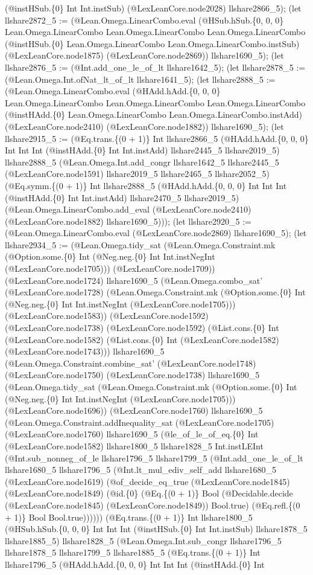 \documentclass[11pt]{article}
\begin{document}
(@instHSub.\{0\} Int Int.instSub) (@LexLeanCore.node2028) llshare2866\_5); (let llshare2872\_5 := (@Lean.Omega.LinearCombo.eval (@HSub.hSub.\{0, 0, 0\} Lean.Omega.LinearCombo Lean.Omega.LinearCombo Lean.Omega.LinearCombo (@instHSub.\{0\} Lean.Omega.LinearCombo Lean.Omega.LinearCombo.instSub) (@LexLeanCore.node1875) (@LexLeanCore.node2869)) llshare1690\_5); (let llshare2876\_5 := (@Int.add\_one\_le\_of\_lt llshare1642\_5); (let llshare2878\_5 := (@Lean.Omega.Int.ofNat\_lt\_of\_lt llshare1641\_5); (let llshare2888\_5 := (@Lean.Omega.LinearCombo.eval (@HAdd.hAdd.\{0, 0, 0\} Lean.Omega.LinearCombo Lean.Omega.LinearCombo Lean.Omega.LinearCombo (@instHAdd.\{0\} Lean.Omega.LinearCombo Lean.Omega.LinearCombo.instAdd) (@LexLeanCore.node2410) (@LexLeanCore.node1882)) llshare1690\_5); (let llshare2915\_5 := (@Eq.trans.\{(0 + 1)\} Int llshare2866\_5 (@HAdd.hAdd.\{0, 0, 0\} Int Int Int (@instHAdd.\{0\} Int Int.instAdd) llshare2445\_5 llshare2019\_5) llshare2888\_5 (@Lean.Omega.Int.add\_congr llshare1642\_5 llshare2445\_5 (@LexLeanCore.node1591) llshare2019\_5 llshare2465\_5 llshare2052\_5) (@Eq.symm.\{(0 + 1)\} Int llshare2888\_5 (@HAdd.hAdd.\{0, 0, 0\} Int Int Int (@instHAdd.\{0\} Int Int.instAdd) llshare2470\_5 llshare2019\_5) (@Lean.Omega.LinearCombo.add\_eval (@LexLeanCore.node2410) (@LexLeanCore.node1882) llshare1690\_5))); (let llshare2920\_5 := (@Lean.Omega.LinearCombo.eval (@LexLeanCore.node2869) llshare1690\_5); (let llshare2934\_5 := (@Lean.Omega.tidy\_sat (@Lean.Omega.Constraint.mk (@Option.some.\{0\} Int (@Neg.neg.\{0\} Int Int.instNegInt (@LexLeanCore.node1705))) (@LexLeanCore.node1709)) (@LexLeanCore.node1724) llshare1690\_5 (@Lean.Omega.combo\_sat' (@LexLeanCore.node1728) (@Lean.Omega.Constraint.mk (@Option.some.\{0\} Int (@Neg.neg.\{0\} Int Int.instNegInt (@LexLeanCore.node1705))) (@LexLeanCore.node1583)) (@LexLeanCore.node1592) (@LexLeanCore.node1738) (@LexLeanCore.node1592) (@List.cons.\{0\} Int (@LexLeanCore.node1582) (@List.cons.\{0\} Int (@LexLeanCore.node1582) (@LexLeanCore.node1743))) llshare1690\_5 (@Lean.Omega.Constraint.combine\_sat' (@LexLeanCore.node1748) (@LexLeanCore.node1750) (@LexLeanCore.node1738) llshare1690\_5 (@Lean.Omega.tidy\_sat (@Lean.Omega.Constraint.mk (@Option.some.\{0\} Int (@Neg.neg.\{0\} Int Int.instNegInt (@LexLeanCore.node1705))) (@LexLeanCore.node1696)) (@LexLeanCore.node1760) llshare1690\_5 (@Lean.Omega.Constraint.addInequality\_sat (@LexLeanCore.node1705) (@LexLeanCore.node1760) llshare1690\_5 (@le\_of\_le\_of\_eq.\{0\} Int (@LexLeanCore.node1582) llshare1800\_5 llshare1828\_5 Int.instLEInt (@Int.sub\_nonneg\_of\_le llshare1796\_5 llshare1799\_5 (@Int.add\_one\_le\_of\_lt llshare1680\_5 llshare1796\_5 (@Int.lt\_mul\_ediv\_self\_add llshare1680\_5 (@LexLeanCore.node1619) (@of\_decide\_eq\_true (@LexLeanCore.node1845) (@LexLeanCore.node1849) (@id.\{0\} (@Eq.\{(0 + 1)\} Bool (@Decidable.decide (@LexLeanCore.node1845) (@LexLeanCore.node1849)) Bool.true) (@Eq.refl.\{(0 + 1)\} Bool Bool.true)))))) (@Eq.trans.\{(0 + 1)\} Int llshare1800\_5 (@HSub.hSub.\{0, 0, 0\} Int Int Int (@instHSub.\{0\} Int Int.instSub) llshare1878\_5 llshare1885\_5) llshare1828\_5 (@Lean.Omega.Int.sub\_congr llshare1796\_5 llshare1878\_5 llshare1799\_5 llshare1885\_5 (@Eq.trans.\{(0 + 1)\} Int llshare1796\_5 (@HAdd.hAdd.\{0, 0, 0\} Int Int Int (@instHAdd.\{0\} Int 
\end{document}
